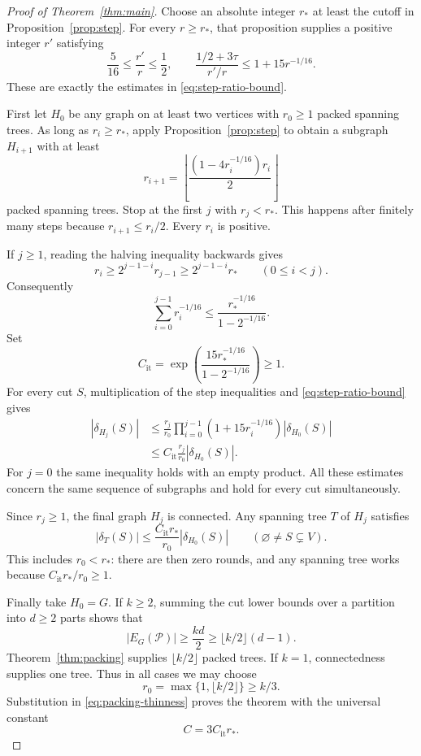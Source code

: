 \documentclass[11pt]{amsart}
\theoremstyle{definition}
\theoremstyle{remark}
\numberwithin{equation}{section}
\begin{document}
\begin{proof}[Proof of Theorem~\ref{thm:main}]
Choose an absolute integer \(r_*\) at least the cutoff in
Proposition~\ref{prop:step}. For every \(r\ge r_*\), that proposition
supplies a positive integer \(r'\) satisfying
\[
 \frac5{16}\le\frac{r'}r\le\frac12,
 \qquad
 \frac{1/2+3\tau}{r'/r}\le1+15r^{-1/16}.
\]
These are exactly the estimates in \eqref{eq:step-ratio-bound}.

First let \(H_0\) be any graph on at least two vertices with
\(r_0\ge1\) packed spanning trees. As long as \(r_i\ge r_*\), apply
Proposition~\ref{prop:step} to obtain a subgraph \(H_{i+1}\)
with at least
\[
 r_{i+1}=
 \left\lfloor\frac{(1-4r_i^{-1/16})r_i}{2}\right\rfloor
\]
packed spanning trees. Stop at the first \(j\) with \(r_j<r_*\).
This happens after finitely many steps because
\(r_{i+1}\le r_i/2\). Every \(r_i\) is positive.

If \(j\ge1\), reading the halving inequality backwards gives
\[
 r_i\ge2^{j-1-i}r_{j-1}
 \ge2^{j-1-i}r_*
 \qquad(0\le i<j).
\]
Consequently
\[
 \sum_{i=0}^{j-1}r_i^{-1/16}
 \le\frac{r_*^{-1/16}}{1-2^{-1/16}}.
\]
Set
\begin{equation}\label{eq:constant-C2}
 C_{\mathrm{it}}=\exp\left(
 \frac{15r_*^{-1/16}}{1-2^{-1/16}}
 \right)\ge1.
\end{equation}
For every cut \(S\), multiplication of the step inequalities and
\eqref{eq:step-ratio-bound} gives
\[
 \begin{aligned}
 |\delta_{H_j}(S)|
 &\le\frac{r_j}{r_0}
   \prod_{i=0}^{j-1}(1+15r_i^{-1/16})
   |\delta_{H_0}(S)|\\
 &\le C_{\mathrm{it}}\frac{r_j}{r_0}|\delta_{H_0}(S)|.
 \end{aligned}
\]
For \(j=0\) the same inequality holds with an empty product.
All these estimates concern the same sequence of subgraphs and
hold for every cut simultaneously.

Since \(r_j\ge1\), the final graph \(H_j\) is connected.
Any spanning tree \(T\) of \(H_j\) satisfies
\begin{equation}\label{eq:packing-thinness}
 |\delta_T(S)|\le\frac{C_{\mathrm{it}}r_*}{r_0}|\delta_{H_0}(S)|
 \qquad(\varnothing\ne S\subsetneq V).
\end{equation}
This includes \(r_0<r_*\): there are then zero rounds, and any
spanning tree works because \(C_{\mathrm{it}}r_*/r_0\ge1\).

Finally take \(H_0=G\). If \(k\ge2\), summing the cut lower bounds
over a partition into \(d\ge2\) parts shows that
\[
 |E_G(\mathcal P)|\ge\frac{kd}{2}
 \ge\lfloor k/2\rfloor(d-1).
\]
Theorem~\ref{thm:packing} supplies \(\lfloor k/2\rfloor\) packed
trees. If \(k=1\), connectedness supplies one tree.
Thus in all cases we may choose
\[
 r_0=\max\{1,\lfloor k/2\rfloor\}\ge k/3.
\]
Substitution in \eqref{eq:packing-thinness} proves the theorem with
the universal constant
\[
 C=3C_{\mathrm{it}}r_*.
\]
\end{proof}
\end{document}

